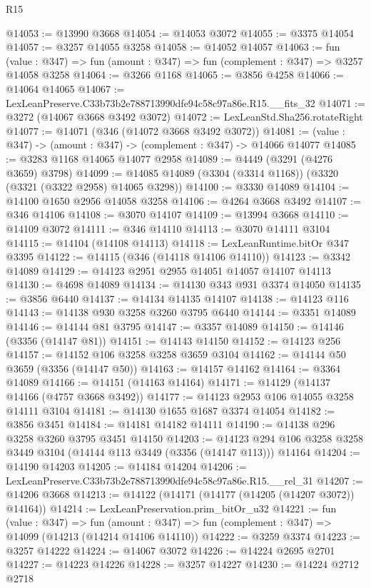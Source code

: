 \begin{lexlean}{R15}
\begin{coremodule}
@14053 := @13990 @3668
@14054 := @14053 @3072
@14055 := @3375 @14054
@14057 := @3257 @14055 @3258
@14058 := @14052 @14057
@14063 := fun (value : @347) => fun (amount : @347) => fun (complement : @347) => @3257 @14058 @3258
@14064 := @3266 @1168
@14065 := @3856 @4258
@14066 := @14064 @14065
@14067 := LexLeanPreserve.C33b73b2e788713990dfe94c58c97a86e.R15.__fits_32
@14071 := @3272 (@14067 @3668 @3492 @3072)
@14072 := LexLeanStd.Sha256.rotateRight
@14077 := @14071 (@346 (@14072 @3668 @3492 @3072))
@14081 := (value : @347) -> (amount : @347) -> (complement : @347) -> @14066 @14077
@14085 := @3283 @1168 @14065 @14077 @2958
@14089 := @4449 (@3291 (@4276 @3659) @3798)
@14099 := @14085 @14089 (@3304 (@3314 @1168)) (@3320 (@3321 (@3322 @2958) @14065 @3298))
@14100 := @3330 @14089
@14104 := @14100 @1650 @2956 @14058 @3258
@14106 := @4264 @3668 @3492
@14107 := @346 @14106
@14108 := @3070 @14107
@14109 := @13994 @3668
@14110 := @14109 @3072
@14111 := @346 @14110
@14113 := @3070 @14111 @3104
@14115 := @14104 (@14108 @14113)
@14118 := LexLeanRuntime.bitOr @347 @3395
@14122 := @14115 (@346 (@14118 @14106 @14110))
@14123 := @3342 @14089
@14129 := @14123 @2951 @2955 @14051 @14057 @14107 @14113
@14130 := @4698 @14089
@14134 := @14130 @343 @931 @3374 @14050
@14135 := @3856 @6440
@14137 := @14134 @14135 @14107
@14138 := @14123 @116
@14143 := @14138 @930 @3258 @3260 @3795 @6440
@14144 := @3351 @14089
@14146 := @14144 @81 @3795
@14147 := @3357 @14089
@14150 := @14146 (@3356 (@14147 @81))
@14151 := @14143 @14150
@14152 := @14123 @256
@14157 := @14152 @106 @3258 @3258 @3659 @3104
@14162 := @14144 @50 @3659 (@3356 (@14147 @50))
@14163 := @14157 @14162
@14164 := @3364 @14089
@14166 := @14151 (@14163 @14164)
@14171 := @14129 (@14137 @14166 (@4757 @3668 @3492))
@14177 := @14123 @2953 @106 @14055 @3258 @14111 @3104
@14181 := @14130 @1655 @1687 @3374 @14054
@14182 := @3856 @3451
@14184 := @14181 @14182 @14111
@14190 := @14138 @296 @3258 @3260 @3795 @3451 @14150
@14203 := @14123 @294 @106 @3258 @3258 @3449 @3104 (@14144 @113 @3449 (@3356 (@14147 @113))) @14164
@14204 := @14190 @14203
@14205 := @14184 @14204
@14206 := LexLeanPreserve.C33b73b2e788713990dfe94c58c97a86e.R15.__rel_31
@14207 := @14206 @3668
@14213 := @14122 (@14171 (@14177 (@14205 (@14207 @3072)) @14164))
@14214 := LexLeanPreservation.prim_bitOr_u32
@14221 := fun (value : @347) =>
  fun (amount : @347) => fun (complement : @347) => @14099 (@14213 (@14214 @14106 @14110))
@14222 := @3259 @3374
@14223 := @3257 @14222
@14224 := @14067 @3072
@14226 := @14224 @2695 @2701
@14227 := @14223 @14226
@14228 := @3257 @14227
@14230 := @14224 @2712 @2718

\end{coremodule}
\end{lexlean}
